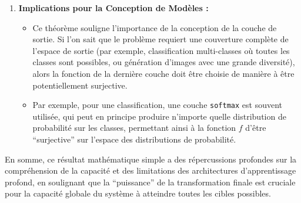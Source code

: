 \documentclass[12pt,a4paper]{report}
\newcommand{\passthrough}[1]{#1}
\providecommand{\tightlist}{%
  \setlength{\itemsep}{0pt}\setlength{\parskip}{0pt}}
\begin{document}
\begin{enumerate}
  \begin{itemize}
  \tightlist
  \item
    Dans les modèles génératifs, comme les Generative Adversarial
    Networks (GANs) ou les Variational Autoencoders (VAEs), le
    générateur \(G\) est une fonction qui mappe un espace latent \(Z\)
    (souvent un bruit aléatoire) vers l'espace des données réelles
    \(X\). L'objectif est que \(G\) soit ``surjectif'' sur la variété
    des données réelles, c'est-à-dire qu'il puisse générer n'importe
    quelle donnée réaliste.
  \item
    Si le générateur \(G\) est lui-même un réseau profond,
    \(G = G_k \circ \dots \circ G_1\), alors la surjectivité de
    l'ensemble \(G\) implique que la dernière couche \(G_k\) doit être
    capable de couvrir l'espace des données. Si \(G_k\) est trop
    restrictive, le modèle ne pourra pas générer toute la diversité des
    données, même si les couches précédentes ont appris des
    représentations latentes riches.
  \end{itemize}
\item
  \textbf{Implications pour la Conception de Modèles :}

  \begin{itemize}
  \tightlist
  \item
    Ce théorème souligne l'importance de la conception de la couche de
    sortie. Si l'on sait que le problème requiert une couverture
    complète de l'espace de sortie (par exemple, classification
    multi-classes où toutes les classes sont possibles, ou génération
    d'images avec une grande diversité), alors la fonction de la
    dernière couche doit être choisie de manière à être potentiellement
    surjective.
  \item
    Par exemple, pour une classification, une couche
    \passthrough{\lstinline!softmax!} est souvent utilisée, qui peut en
    principe produire n'importe quelle distribution de probabilité sur
    les classes, permettant ainsi à la fonction \(f\) d'être
    ``surjective'' sur l'espace des distributions de probabilité.
  \end{itemize}
\end{enumerate}

En somme, ce résultat mathématique simple a des répercussions profondes
sur la compréhension de la capacité et des limitations des architectures
d'apprentissage profond, en soulignant que la ``puissance'' de la
transformation finale est cruciale pour la capacité globale du système à
atteindre toutes les cibles possibles.
\newpage
\end{document}
